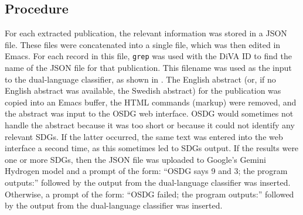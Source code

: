 \subsection{Procedure}
\label{sec:procedure}
For each extracted publication, the relevant information was stored in a \gls{JSON} file. These files were concatenated into a single file, which was then edited in Emacs. For each record in this file, \texttt{grep} was used with the \gls{DiVA} ID to find the name of the \gls{JSON} file for that publication. This filename was used as the input to the dual-language classifier, as shown in . The English abstract (or, if no English abstract was available, the Swedish abstract) for the publication was copied into an Emacs buffer, the \gls{HTML} commands (\ie markup) were removed, and the abstract was input to the OSDG web interface. OSDG would sometimes not handle the abstract because it was too short or because it could not identify any relevant \glspl{SDG}. If the latter occurred, the same text was entered into the web interface a second time, as this sometimes led to \glspl{SDG} output. If the results were one or more \glspl{SDG}, then the \gls{JSON} file was uploaded to Google's Gemini Hydrogen model and a prompt of the form: \enquote{OSDG says 9 and 3; the program outputs:} followed by the output from the dual-language classifier was inserted. Otherwise, a prompt of the form: \enquote{OSDG failed; the program outputs:} followed by the output from the dual-language classifier was inserted.

